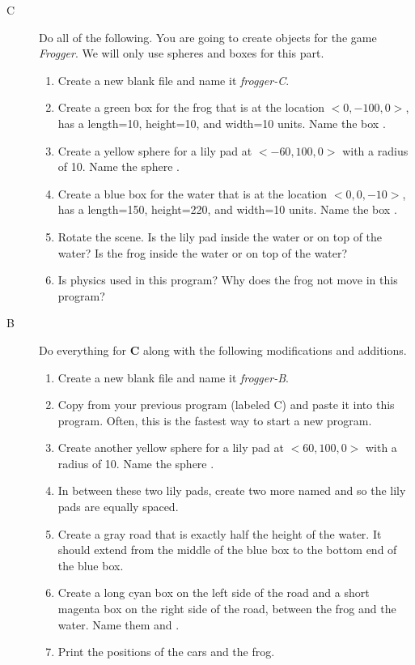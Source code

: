 \begin{description}

\item[C] Do all of the following.
You are going to create objects for the game \emph{Frogger}. We will only use spheres and boxes for this part.
\begin{enumerate}
	\item Create a new blank file and name it \emph{frogger-C}. 
	\item Create a green box for the frog that is at the location $<0,-100,0>$, has a length=10, height=10, and width=10 units. Name the box .
	\item Create a yellow sphere for a lily pad at $<-60,100,0>$ with a radius of 10. Name the sphere .
	\item Create a blue box for the water that is at the location $<0,0,-10>$, has a length=150, height=220, and width=10 units. Name the box .
	\item Rotate the scene. Is the lily pad inside the water or on top of the water?  Is the frog inside the water or on top of the water?
	\item Is physics used in this program? Why does the frog not move in this program?
\end{enumerate}

\item[B] Do everything for {\bf C} along with the following modifications and additions.

\begin{enumerate}
	\item Create a new blank file and name it \emph{frogger-B}. 
	\item Copy from your previous program (labeled C) and paste it into this program. Often, this is the fastest way to start a new program.
	\item Create another yellow sphere for a lily pad at $<60,100,0>$ with a radius of 10. Name the sphere .
	\item In between these two lily pads, create two more named   and   so the lily pads are equally spaced.
	\item Create a gray road that is exactly half the height of the water. It should extend from the middle of the blue box to the bottom end of the blue box.
	\item Create a long cyan box on the left side of the road and a short magenta box on the right side of the road, between the frog and the water. Name them  and .
	\item Print the positions of the cars and the frog.
\end{enumerate}


\end{description}
